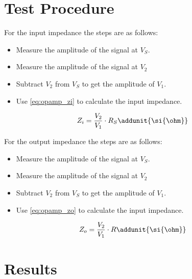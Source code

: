 \section{Test Procedure}

For the input impedance the steps are as follows:
\begin{itemize}
\item Measure the amplitude of the signal at $V_S$.
\item Measure the amplitude of the signal at $V_2$ 
\item Subtract $V_2$ from $V_S$ to get the amplitude of $V_1$. 
\item Use \autoref{eq:opamp_zi} to calculate the input impedance.
\end{itemize}

\begin{equation}\label{eq:opamp_zi}
        Z_i = \frac{V_2}{V_1} \cdot R_S
        \addunit{\si{\ohm}}
    \end{equation}

    \startexplain
    \stopexplain
    
For the output impedance the steps are as follows:
\begin{itemize}
\item Measure the amplitude of the signal at $V_S$.
\item Measure the amplitude of the signal at $V_2$ 
\item Subtract $V_2$ from $V_S$ to get the amplitude of $V_1$. 
\item Use \autoref{eq:opamp_zo} to calculate the input impedance.
\end{itemize}

\begin{equation}\label{eq:opamp_zo}
        Z_o = \frac{V_2}{V_1} \cdot R
        \addunit{\si{\ohm}}
    \end{equation}

    \startexplain
    \stopexplain

\section{Results}

